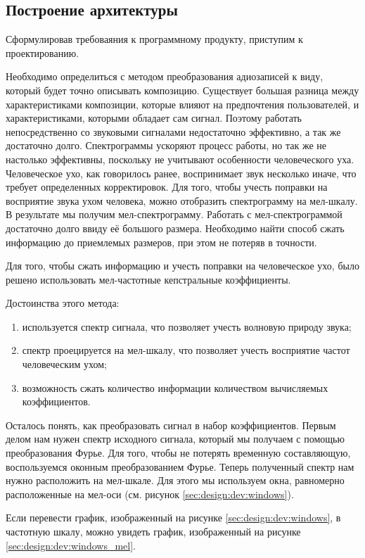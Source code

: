 \subsection{Построение архитектуры}
\label{sec:design:dev}

Сформулировав требоваяния к программному продукту, приступим к проектированию.

Необходимо определиться с методом преобразования адиозаписей к виду, который будет точно описывать композицию. Существует большая разница между характеристиками композиции, которые влияют на предпочтения пользователей, и характеристиками, которыми обладает сам сигнал. Поэтому работать непосредственно со звуковыми сигналами недостаточно эффективно, а так же достаточно долго. Спектрограммы ускоряют процесс работы, но так же не настолько эффективны, поскольку не учитывают особенности человеческого уха. Человеческое ухо, как говорилось ранее, воспринимает звук несколько иначе, что требует определенных корректировок. Для того, чтобы учесть поправки на восприятие звука ухом человека, можно отобразить спектрограмму на мел-шкалу. В результате мы получим мел-спектрограмму. Работать с мел-спектрограммой достаточно долго ввиду её большого размера. Необходимо найти способ сжать информацию до приемлемых размеров, при этом не потеряв в точности.

Для того, чтобы сжать информацию и учесть поправки на человеческое ухо, было решено использовать мел-частотные кепстральные коэффициенты.

Достоинства этого метода:
\begin{enumerate}
  \item используется спектр сигнала, что позволяет учесть волновую природу звука;
  \item спектр проецируется на мел-шкалу, что позволяет учесть восприятие частот человеческим ухом;
  \item возможность сжать количество информации количеством вычисляемых коэффициентов.
\end{enumerate}

Осталось понять, как преобразовать сигнал в набор коэффициентов. Первым делом нам нужен спектр исходного сигнала, который мы получаем с помощью преобразования Фурье. Для того, чтобы не потерять временную составляющую, воспользуемся оконным преобразованием Фурье. Теперь полученный спектр нам нужно расположить на мел-шкале. Для этого мы используем окна, равномерно расположенные на мел-оси (см. рисунок \ref{sec:design:dev:windows}).

Если перевести график, изображенный на рисунке \ref{sec:design:dev:windows}, в частотную шкалу, можно увидеть график, изображенный на рисунке \ref{sec:design:dev:windows_mel}.

